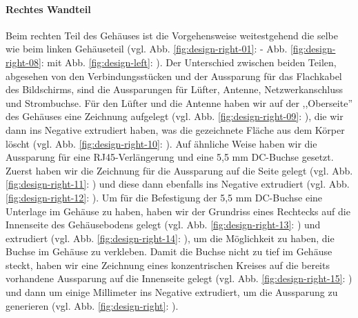 \paragraph{Rechtes Wandteil}
Beim rechten Teil des Gehäuses ist die Vorgehensweise weitestgehend die selbe wie beim linken Gehäuseteil (vgl. Abb. \ref{fig:design-right-01}: - Abb. \ref{fig:design-right-08}:  mit Abb. \ref{fig:design-left}: ). 
Der Unterschied zwischen beiden Teilen, abgesehen von den Verbindungsstücken und der Aussparung für das Flachkabel des Bildschirms, sind die Aussparungen für Lüfter, Antenne, Netzwerkanschluss und Strombuchse. 
Für den Lüfter und die Antenne haben wir auf der ,,Oberseite'' des Gehäuses eine Zeichnung aufgelegt (vgl. Abb. \ref{fig:design-right-09}: ), die  wir dann ins Negative extrudiert haben, was die gezeichnete Fläche aus dem Körper löscht (vgl. Abb. \ref{fig:design-right-10}: ). 
Auf ähnliche Weise haben wir die Aussparung für eine RJ45-Verlängerung und eine 5,5 mm DC-Buchse gesetzt. Zuerst haben wir die Zeichnung für die Aussparung auf die Seite gelegt (vgl. Abb.  \ref{fig:design-right-11}: ) und diese dann ebenfalls ins Negative extrudiert (vgl. Abb. \ref{fig:design-right-12}: ). 
Um für die Befestigung der 5,5 mm DC-Buchse eine Unterlage im Gehäuse zu haben, haben wir der Grundriss eines Rechtecks auf die Innenseite des Gehäusebodens gelegt (vgl. Abb.  \ref{fig:design-right-13}: ) und extrudiert (vgl. Abb. \ref{fig:design-right-14}: ), um die Möglichkeit zu haben, die Buchse im Gehäuse zu verkleben. 
Damit die Buchse nicht zu tief im Gehäuse steckt, haben wir eine Zeichnung eines konzentrischen Kreises auf die bereits vorhandene Aussparung auf die Innenseite gelegt  (vgl. Abb.  \ref{fig:design-right-15}: ) und dann um einige Millimeter ins Negative extrudiert, um die Aussparung zu generieren (vgl. Abb. \ref{fig:design-right}: ).\par

